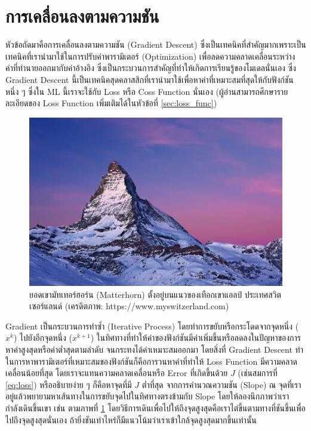 \section{การเคลื่อนลงตามความชัน}
\label{sec:gradient_descent}

หัวข้อถัดมาคือการเคลื่อนลงตามความชัน (Gradient Descent) ซึ่งเป็นเทคนิคที่สำคัญมากเพราะเป็นเทคนิคที่เรานำมาใช้ในการปรับค่าพารามิเตอร์ 
(Optimization) เพื่อลดความคลาดเคลื่อนระหว่างค่าที่ทำนายออกมากับค่าอ้างอิง ซึ่งเป็นกระบวนการสำคัญที่ทำให้เกิดการเรียนรู้ของโมเดลนั่นเอง
ซึ่ง Gradient Descent นี้เป็นเทคนิคสุดคลาสสิกที่เรานำมาใช้เพื่อหาค่าที่เหมาะสมที่สุดให้กับฟังก์ชันหนึ่ง ๆ ซึ่งใน ML นี้เราจะใช้กับ Loss หรือ 
Coss Function นั่นเอง (ผู้อ่านสามารถศึกษารายละเอียดของ Loss Function เพิ่มเติมได้ในหัวข้อที่ \ref{sec:loss_func})

\begin{figure}[H]
    \centering
    \includegraphics[width=0.8\linewidth]{fig/matterhorn.png}
    \caption{ยอดเขามัทเทอร์ฮอร์น (Matterhorn) ตั้งอยู่บนแนวของเทือกเขาแอลป์ ประเทศสวิตเซอร์แลนด์
    (เครดิตภาพ: https://www.myswitzerland.com)}
    \label{fig:matterhorn}
\end{figure}

Gradient เป็นกระบวนการทำซ้ำ (Iterative Process) โดยทําการขยับหรือกระโดดจากจุดหนึ่ง ($x^{k}$) ไปยังอีกจุดหนึ่ง ($x^{k+1}$) 
ในทิศทางที่ทําให้ค่าของฟังก์ชันมีค่าเพิ่มขึ้นหรือลดลงในปัญหาของการหาค่าสูงสุดหรือค่าต่ำสุดตามลำดับ จนกระทงได้ค่าเหมาะสมออกมา โดยสิ่งที่ 
Gradient Descent ทำในการหาพารามิเตอร์ที่เหมาะสมของฟังก์ชันก็คือการวนหาค่าที่ทำให้ Loss Function มีความคลาดเคลื่อนน้อยที่สุด 
โดยเราจะแทนความคลาดเคลื่อนหรือ Error ที่เกิดขึ้นด้วย $J$ (เช่นสมการที่ \ref{eq:loss}) หรืออธิบายง่าย ๆ ก็คือหาจุดที่มี $J$ ต่ำที่สุด%
จากการคำนวณความชัน (Slope) ณ จุดที่เราอยู่แล้วพยายามหาเส้นทางในการขยับจุดไปในทิศทางตรงข้ามกับ Slope โดยให้ลองนึกภาพว่าเรา%
กำลังเดินขึ้นเขา เช่น ตามภาพที่ \ref{fig:matterhorn} โดยวิธีการเดินเพื่อไปให้ถึงจุดสูงสุดคือเราไต่ขึ้นตามทางที่ชันขึ้นเพื่อไปถึงจุดสูงสุดนั่นเอง 
ถ้ายิ่งชันเท่าไหร่ก็มีแนวโน้มว่าเราเข้าใกล้จุดสูงสุดมากขึ้นเท่านั้น

